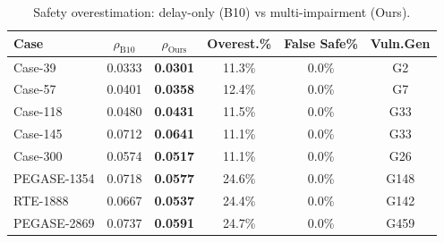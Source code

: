 \begin{table}[t]
\centering
\caption{Safety overestimation: delay-only (B10) vs multi-impairment (Ours).}
\label{tab:overestimation}
\begin{tabular}{lccccc}
\toprule
Case & $\rho_{\text{B10}}$ & $\rho_{\text{Ours}}$ & Overest.\% & False Safe\% & Vuln.Gen \\
\midrule
Case-39 & 0.0333 & \textbf{0.0301} & 11.3\% & 0.0\% & G2 \\
Case-57 & 0.0401 & \textbf{0.0358} & 12.4\% & 0.0\% & G7 \\
Case-118 & 0.0480 & \textbf{0.0431} & 11.5\% & 0.0\% & G33 \\
Case-145 & 0.0712 & \textbf{0.0641} & 11.1\% & 0.0\% & G33 \\
Case-300 & 0.0574 & \textbf{0.0517} & 11.1\% & 0.0\% & G26 \\
PEGASE-1354 & 0.0718 & \textbf{0.0577} & 24.6\% & 0.0\% & G148 \\
RTE-1888 & 0.0667 & \textbf{0.0537} & 24.4\% & 0.0\% & G142 \\
PEGASE-2869 & 0.0737 & \textbf{0.0591} & 24.7\% & 0.0\% & G459 \\
\bottomrule
\end{tabular}
\end{table}